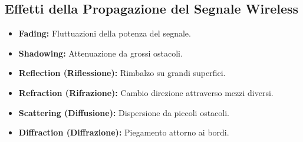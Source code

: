 \documentclass{article}
\begin{document}
\subsection{Effetti della Propagazione del Segnale Wireless}
\begin{itemize}
    \item \textbf{Fading:} Fluttuazioni della potenza del segnale.
    \item \textbf{Shadowing:} Attenuazione da grossi ostacoli.
    \item \textbf{Reflection (Riflessione):} Rimbalzo su grandi superfici.
    \item \textbf{Refraction (Rifrazione):} Cambio direzione attraverso mezzi diversi.
    \item \textbf{Scattering (Diffusione):} Dispersione da piccoli ostacoli.
    \item \textbf{Diffraction (Diffrazione):} Piegamento attorno ai bordi.
\end{itemize}
\end{document}
